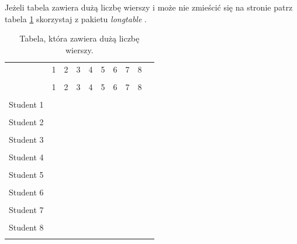 \documentclass[data-science]{agh-wi} %
\begin{document}
Jeżeli tabela zawiera dużą liczbę wierszy i może nie zmieścić się na stronie \pauza patrz tabela \ref{tab:longtable} \pauza skorzystaj z pakietu \emph{longtable} \cite{longtable}.
\begin{longtable}{|p{14ex}|p{1.5em}|p{1.5em}|p{1.5em}|p{1.5em}|p{1.5em}|p{1.5em}|p{1.5em}|p{1.5em}|p{1.5em}|}
    \caption{Tabela, która zawiera dużą liczbę wierszy\label{tab:longtable}.}
    \endfirsthead
    \hline
              & 1 & 2 & 3 & 4 & 5 & 6 & 7 & 8 & \\
    \cline{2-9}
              &   &   &   &   &   &   &   &   & \\
    \hline
    \endhead
    \endfoot
    \hline\hline
              & 1 & 2 & 3 & 4 & 5 & 6 & 7 & 8 & \\
    \cline{2-9}
              &   &   &   &   &   &   &   &   & \\
    \hline\hline
    Student 1 &   &   &   &   &   &   &   &   & \\
    \cline{2-9}
              &   &   &   &   &   &   &   &   & \\
    \hline\hline
    Student 2 &   &   &   &   &   &   &   &   & \\
    \cline{2-9}
              &   &   &   &   &   &   &   &   & \\
    \hline\hline
    Student 3 &   &   &   &   &   &   &   &   & \\
    \cline{2-9}
              &   &   &   &   &   &   &   &   & \\
    \hline\hline
    Student 4 &   &   &   &   &   &   &   &   & \\
    \cline{2-9}
              &   &   &   &   &   &   &   &   & \\
    \hline\hline
    Student 5 &   &   &   &   &   &   &   &   & \\
    \cline{2-9}
              &   &   &   &   &   &   &   &   & \\
    \hline\hline
    Student 6 &   &   &   &   &   &   &   &   & \\
    \cline{2-9}
              &   &   &   &   &   &   &   &   & \\
    \hline\hline
    Student 7 &   &   &   &   &   &   &   &   & \\
    \cline{2-9}
              &   &   &   &   &   &   &   &   & \\
    \hline\hline
    Student 8 &   &   &   &   &   &   &   &   & \\
    \cline{2-9}
              &   &   &   &   &   &   &   &   & \\

\end{longtable}
\end{document}
